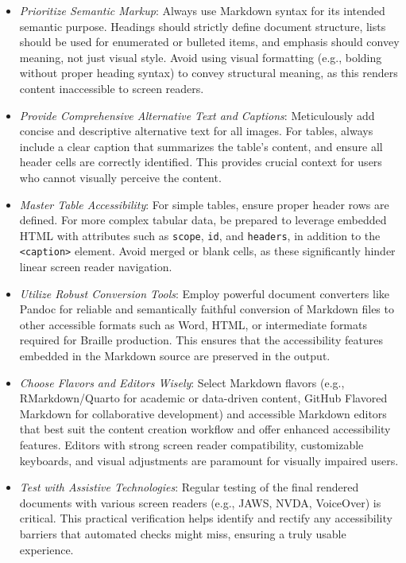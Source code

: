 \begin{itemize}
	\item \emph{Prioritize Semantic Markup}: Always use Markdown syntax for its intended semantic purpose. Headings should strictly define document structure, lists should be used for enumerated or bulleted items, and emphasis should convey meaning, not just visual style. Avoid using visual formatting (e.g., bolding without proper heading syntax) to convey structural meaning, as this renders content inaccessible to screen readers.
	\item \emph{Provide Comprehensive Alternative Text and Captions}: Meticulously add concise and descriptive alternative text for all images. For tables, always include a clear caption that summarizes the table's content, and ensure all header cells are correctly identified. This provides crucial context for users who cannot visually perceive the content.
	\item \emph{Master Table Accessibility}: For simple tables, ensure proper header rows are defined. For more complex tabular data, be prepared to leverage embedded HTML with attributes such as \texttt{scope}, \texttt{id}, and \texttt{headers}, in addition to the \texttt{<caption>} element. Avoid merged or blank cells, as these significantly hinder linear screen reader navigation.
	\item \emph{Utilize Robust Conversion Tools}: Employ powerful document converters like Pandoc for reliable and semantically faithful conversion of Markdown files to other accessible formats such as Word, HTML, or intermediate formats required for Braille production. This ensures that the accessibility features embedded in the Markdown source are preserved in the output.
	\item \emph{Choose Flavors and Editors Wisely}: Select Markdown flavors (e.g., RMarkdown/Quarto for academic or data-driven content, GitHub Flavored Markdown for collaborative development) and accessible Markdown editors that best suit the content creation workflow and offer enhanced accessibility features. Editors with strong screen reader compatibility, customizable keyboards, and visual adjustments are paramount for visually impaired users.
	\item \emph{Test with Assistive Technologies}: Regular testing of the final rendered documents with various screen readers (e.g., JAWS, NVDA, VoiceOver) is critical. This practical verification helps identify and rectify any accessibility barriers that automated checks might miss, ensuring a truly usable experience.

\end{itemize}
